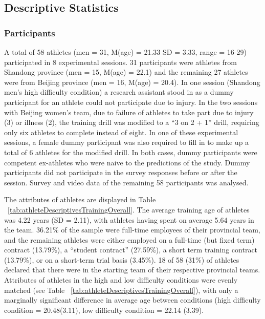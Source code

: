 \subsection{Descriptive Statistics \label{sec:descriptives}}

\subsubsection{Participants}

A total of 58 athletes (men = 31, M(age) = 21.33 SD = 3.33, range = 16-29) participated in 8 experimental sessions. 31 participants were athletes from Shandong province (men = 15, M(age) = 22.1) and the remaining 27 athletes were from Beijing province (men = 16, M(age) = 20.4).  In one session (Shandong men's high difficulty condition) a research assistant stood in as a dummy participant for an athlete could not participate due to injury.  In the two sessions with Beijing women's team, due to failure of athletes to take part due to injury (3) or illness (2), the training drill was modified to a ``3 on 2 + 1'' drill, requiring only six athletes to complete instead of eight. In one of these experimental sessions, a female dummy participant was also required to fill in to make up a total of 6 athletes for the modified drill.  In both cases, dummy participants were competent ex-athletes who were naive to the predictions of the study.  Dummy participants did not participate in the survey responses before or after the session. Survey and video data of the remaining 58 participants was analysed.



The attributes of athletes are displayed in Table ~\ref{tab:athleteDescriptivesTrainingOverall}. The average training age of athletes was 4.22 years (SD = 2.11), with athletes having spent on average 5.64 years in the team. 36.21\% of the sample were full-time employees of their provincial team, and the remaining athletes were either employed on a full-time (but fixed term) contract
(13.79\%), a ``student contract'' (27.59\%), a short term training contract (13.79\%), or on a short-term trial basis (3.45\%).  18 of 58 (31\%) of athletes declared that there were in the starting team of their respective provincial teams.
Attributes of athletes in the high and low difficulty conditions were evenly matched (see Table ~\ref{tab:athleteDescriptivesTrainingOverall}), with only a marginally significant difference in average age between conditions (high difficulty condition = 20.48(3.11), low difficulty condition = 22.14 (3.39).

